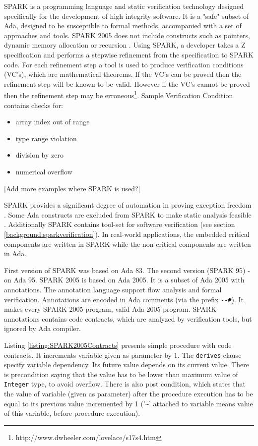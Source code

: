 SPARK is a programming language and static verification technology designed specifically for the development of high integrity software. It is a "safe" subset of Ada, designed to be susceptible to formal methods, accompanied with a set of approaches and tools. SPARK 2005 does not include constructs such as pointers, dynamic memory allocation or recursion \cite{Spark:Article}. Using SPARK, a developer takes a Z specification and performs a stepwise refinement from the specification to SPARK code. For each refinement step a tool is used to produce verification conditions (VC's), which are mathematical theorems. If the VC's can be proved then the refinement step will be known to be valid. However if the VC's cannot be proved then the refinement step may be erroneous\footnote{http://www.dwheeler.com/lovelace/s17s4.htm}. Sample Verification Condition contains checks for:
\begin{itemize} \itemsep1pt \parskip0pt 
    \item array index out of range
    \item type range violation
    \item division by zero
    \item numerical overflow
\end{itemize}

[Add more examples where SPARK is used?]

SPARK provides a significant degree of automation in proving exception freedom \cite{Spark:Article}. Some Ada constructs are excluded from SPARK to make static analysis feasible \cite{Spark:Article}. Additionally SPARK contains tool-set for software verification (see section \ref{background:sparkverification}). In real-world applications, the embedded critical components are written in SPARK while the non-critical components are written in Ada.

First version of SPARK was based on Ada 83. The second version (SPARK 95) - on Ada 95. SPARK 2005 is based on Ada 2005. It is a subset of Ada 2005 with annotations. The annotation language support flow analysis and formal verification. Annotations are encoded in Ada comments (via the prefix \lstinline{--#}). It makes every SPARK 2005 program, valid Ada 2005 program. SPARK annotations contains code contracts, which are analyzed by verification tools, but ignored by Ada compiler.

Listing \ref{listing:SPARK2005Contracts} presents simple procedure with code contracts. It increments variable given as parameter by 1. The \lstinline{derives} clause specify variable dependency. Its future value depends on its current value. There is precondition saying that the value has to be lower than maximum value of \lstinline{Integer} type, to avoid overflow. There is also post condition, which states that the value of variable (given as parameter) after the procedure execution has to be equal to its previous value incremented by 1 ('\lstinline{~}' attached to variable means value of this variable, before procedure execution).

